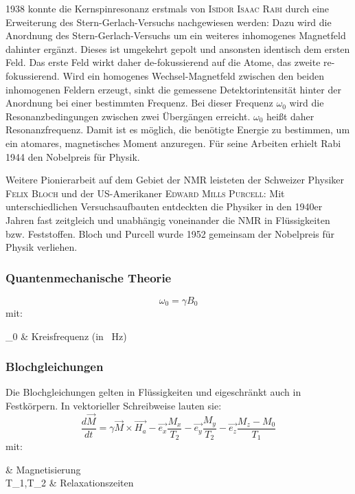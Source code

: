 1938 konnte die Kernspinresonanz erstmals von \textsc{Isidor Isaac Rabi} durch eine Erweiterung des Stern-Gerlach-Versuchs nachgewiesen werden: Dazu wird die Anordnung des Stern-Gerlach-Versuchs um ein weiteres inhomogenes Magnetfeld dahinter ergänzt. Dieses ist umgekehrt gepolt und ansonsten identisch dem ersten Feld. Das erste Feld wirkt daher de-fokussierend auf die Atome, das zweite re-fokussierend. Wird ein homogenes Wechsel-Magnetfeld zwischen den beiden inhomogenen Feldern erzeugt, sinkt die gemessene Detektorintensität hinter der Anordnung bei einer bestimmten Frequenz. Bei dieser Frequenz $\omega_0$ wird die Resonanzbedingungen zwischen zwei Übergängen erreicht. $\omega_0$ heißt daher Resonanzfrequenz. Damit ist es möglich, die benötigte Energie zu bestimmen, um ein atomares, magnetisches Moment anzuregen. Für seine Arbeiten erhielt Rabi 1944 den Nobelpreis für Physik. \cite{Rabi1938}

Weitere Pionierarbeit auf dem Gebiet der NMR leisteten der Schweizer Physiker \textsc{Felix Bloch} und der US-Amerikaner \textsc{Edward Mills Purcell}: Mit unterschiedlichen Versuchsaufbauten entdeckten die Physiker in den 1940er Jahren fast zeitgleich und unabhängig voneinander die NMR in Flüssigkeiten bzw. Feststoffen. Bloch und Purcell wurde 1952 gemeinsam der Nobelpreis für Physik verliehen.

\subsubsection{Quantenmechanische Theorie}

\begin{equation}
	\omega_0=\gamma B_0
\end{equation}
mit:
\begin{with}
\omega_0 & Kreisfrequenz (in \SI{}{\hertz}) \\
\end{with}

\subsubsection{Blochgleichungen}
Die Blochgleichungen gelten in Flüssigkeiten und eigeschränkt auch in Festkörpern. In vektorieller Schreibweise lauten sie:
\begin{equation}
	\frac{d\vec{M}}{dt}=\gamma\vec{M}\times\vec{H_a}-\vec{e_x}\frac{M_x}{T_2}-\vec{e_y}\frac{M_y}{T_2}-\vec{e_z}\frac{M_z-M_0}{T_1}
\end{equation}
mit:
\begin{with*}
	 & Magnetisierung \\
	T_1,T_2 & Relaxationszeiten \\
\end{with*}

